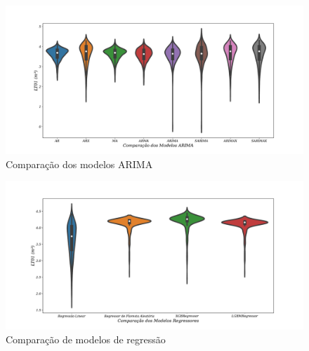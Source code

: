 \begin{figure}[H]
	\centering
	\caption{Comparação dos modelos ARIMA}\label{fig:modelos-arima}
	\includegraphics[width=0.8\linewidth]{Resultados/Figuras/modelos-arima}
	
\end{figure}

\begin{figure}[!h]
	\centering
	\caption{Comparação de modelos de regressão}\label{fig:violin-lr-xgb-lgbm-rf}
	\includegraphics[width=0.8\linewidth]{Resultados/Figuras/violin-LR-XGB-LGBM-RF}
	
	
	
\end{figure}

